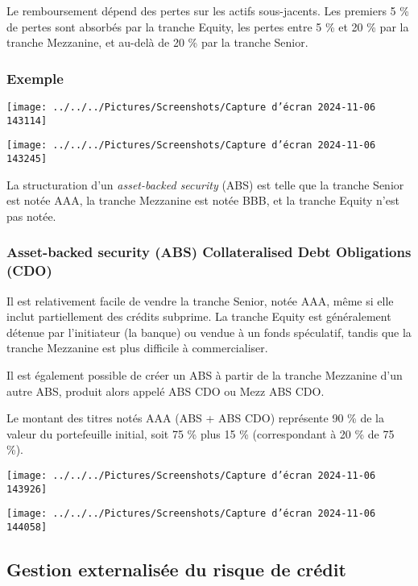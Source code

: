 \documentclass[a4paper, 12pt]{report}
\begin{document}
Le remboursement dépend des pertes sur les actifs sous-jacents. Les premiers 5 \% de pertes sont absorbés par la tranche Equity, les pertes entre 5 \% et 20 \% par la tranche Mezzanine, et au-delà de 20 \% par la tranche Senior.

\subsubsection{Exemple}

\begin{center}
	\texttt{[image: ../../../Pictures/Screenshots/Capture d'écran 2024-11-06 143114]}
\end{center}

\begin{center}
	\texttt{[image: ../../../Pictures/Screenshots/Capture d'écran 2024-11-06 143245]}
\end{center}


La structuration d’un \textit{asset-backed security} (ABS) est telle que la tranche Senior est notée AAA, la tranche Mezzanine est notée BBB, et la tranche Equity n’est pas notée.

\subsubsection{Asset-backed security (ABS) Collateralised Debt Obligations (CDO)}

Il est relativement facile de vendre la tranche Senior, notée AAA, même si elle inclut partiellement des crédits subprime. La tranche Equity est généralement détenue par l’initiateur (la banque) ou vendue à un fonds spéculatif, tandis que la tranche Mezzanine est plus difficile à commercialiser.

Il est également possible de créer un ABS à partir de la tranche Mezzanine d’un autre ABS, produit alors appelé ABS CDO ou Mezz ABS CDO.

Le montant des titres notés AAA (ABS + ABS CDO) représente 90 \% de la valeur du portefeuille initial, soit 75 \% plus 15 \% (correspondant à 20 \% de 75 \%).

\begin{center}
	\texttt{[image: ../../../Pictures/Screenshots/Capture d'écran 2024-11-06 143926]}
	
	\texttt{[image: ../../../Pictures/Screenshots/Capture d'écran 2024-11-06 144058]}
\end{center}

\subsection{Gestion externalisée du risque de crédit}
\end{document}
